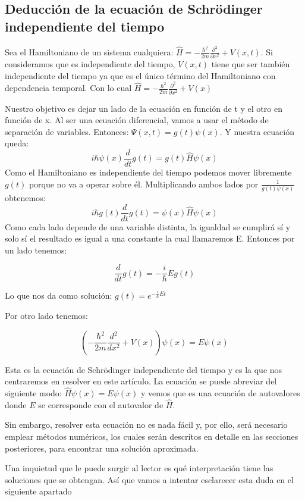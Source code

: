 \documentclass[12pt]{article}
\begin{document}
\subsection{Deducción de la ecuación de Schrödinger independiente del tiempo}
Sea el Hamiltoniano de un sistema cualquiera: 
$\hat{H}=-\frac{\hbar^{2}}{2m}\frac{\partial^{2}}{\partial x^{2}}+V(x,t)$.
Si consideramos que es independiente del tiempo, $V(x,t)$ tiene que ser también 
independiente del tiempo ya que es el único término del Hamiltoniano
con dependencia temporal. Con lo cual $\hat{H}=-\frac{\hbar^{2}}{2m}\frac{\partial^{2}}{\partial x^{2}}+V(x)$ \\
\par
Nuestro objetivo es dejar un lado de la ecuación en función de t y el otro en función de x. Al ser una ecuación diferencial, vamos a usar el método de separación de variables. Entonces: $\Psi (x,t)= g(t) \psi(x)$. 
Y nuestra ecuación queda:
\begin{equation}
i\hbar \psi (x) \frac{d}{d t}g(t)= g(t) \hat{H} \psi (x)
\end{equation}
Como el Hamiltoniano es independiente del tiempo podemos mover libremente 
$g(t)$ porque no va a operar sobre él. Multiplicando ambos 
lados por $\frac{1}{g(t)\psi(x)}$ obtenemos:
\begin{equation}
i\hbar g(t) \frac{d}{d t}g(t)= \psi(x) \hat{H} \psi (x)
\end{equation}
Como cada lado depende de una variable distinta, la igualdad
se cumplirá sí y solo sí el resultado es igual a una constante la cual 
llamaremos E. Entonces por un lado tenemos:

\begin{equation}
\frac{d}{d t}g(t)=-\frac{i}{\hbar} Eg(t)
\end{equation}

Lo que nos da como solución: $g(t)= e^{-\frac{i}{\hbar}Et}$ \\
\par
Por otro lado tenemos:

\begin{equation}
\left(-\frac{\hbar^{2}}{2m}\frac{d^{2}}{d x^{2}}+V(x)\right) \psi(x)=E \psi(x)
\end{equation}

Esta es la ecuación de Schrödinger independiente del tiempo 
y es la que nos centraremos en resolver en este artículo. 
La ecuación se puede abreviar del siguiente modo: $\hat{H} \psi (x)=E \psi (x)$ y vemos
que es una ecuación de autovalores donde $E$ se corresponde con el autovalor
de $\hat{H}$. \\
\par
Sin embargo, resolver esta ecuación no es nada fácil y, 
por ello, será necesario emplear métodos numéricos, 
los cuales serán descritos en detalle 
en las secciones posteriores, para encontrar una solución aproximada. \\
\par 
Una inquietud que le puede surgir al lector es qué interpretación
tiene las soluciones que se obtengan. Así que vamos a intentar esclarecer
esta duda en el siguiente apartado
\end{document}
